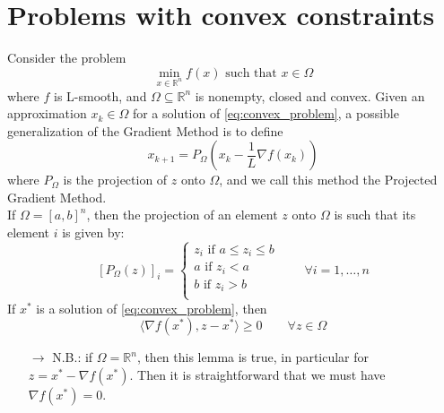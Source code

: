 \documentclass[12pt, openany]{report}
\theoremstyle{definition}
\begin{document}
\section{Problems with convex constraints}
Consider the problem
\begin{equation}\label{eq:convex_problem}
    \min_{x\in \mathbb{R}^n} f(x) \text{ such that } x\in \Omega
\end{equation}
where \(f\) is L-smooth, and \(\Omega \subseteq \mathbb{R}^n\) is nonempty, closed and convex.
Given an approximation \(x_k\in \Omega\) for a solution of \ref{eq:convex_problem}, a possible generalization of the Gradient Method is to define 
\begin{equation}
    x_{k+1} = P_{\Omega} \left(x_k-\frac{1}{L}\nabla f(x_k)\right)
\end{equation}
where \(P_{\Omega}\) is the projection of \(z\) onto \(\Omega\), and we call this method the Projected Gradient Method.\\
If \(\Omega = [a,b]^n\), then the projection of an element \(z\) onto \(\Omega\) is such that its element \(i\) is given by:
\begin{equation}
    \left[P_\Omega(z)\right]_i = \begin{cases}
        z_i \text{ if } a\le z_i\le b\\
        a \text{ if } z_i<a\\
        b \text{ if }z_i>b\\
    \end{cases} \qquad \forall i=1,\dots,n
\end{equation}
If \(x^*\) is a solution of \eqref{eq:convex_problem}, then \[\langle \nabla f(x^*),z-x^*\rangle \ge 0\qquad \forall z \in \Omega\]
\begin{itemize}
    \item [\(\rightarrow\)] N.B.: if \(\Omega = \mathbb{R}^n\), then this lemma is true, in particular for \(z=x^*-\nabla f(x^*)\). Then it is straightforward that we must have \(\nabla f(x^*)=0\). 
\end{itemize}
\end{document}

